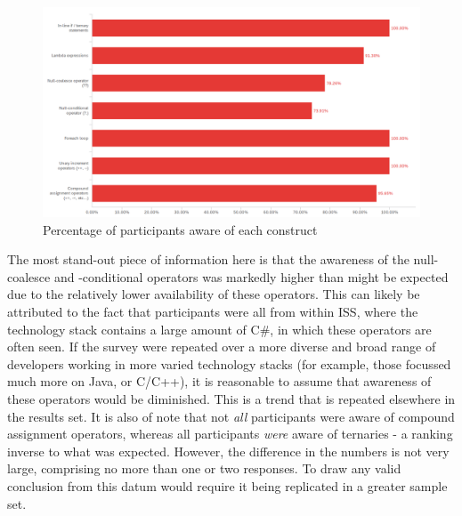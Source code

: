\documentclass{article}
\begin{document}
            \begin{figure}[htbp]
                \centering
                \includegraphics[width=1.0\textwidth]{awareness}
                \caption{Percentage of participants aware of each construct}
                \label{fig:awareness}
            \end{figure}

            The most stand-out piece of information here is that the awareness of the null-coalesce and -conditional operators was markedly higher than might be expected due to the relatively lower availability of these operators. This can likely be attributed to the fact that participants were all from within ISS, where the  technology stack contains a large amount of C\#, in which these operators are often seen. If the survey were repeated over a more diverse and broad range of developers working in more varied technology stacks (for example, those focussed much more on Java, or C/C++), it is reasonable to assume that awareness of these operators would be diminished. This is a trend that is repeated elsewhere in the results set.
            It is also of note that not \emph{all} participants were aware of compound assignment operators, whereas all participants \emph{were} aware of ternaries - a ranking inverse to what was expected. However, the difference in the numbers is not very large, comprising no more than one or two responses. To draw any valid conclusion from this datum would require it being replicated in a greater sample set.
\end{document}
